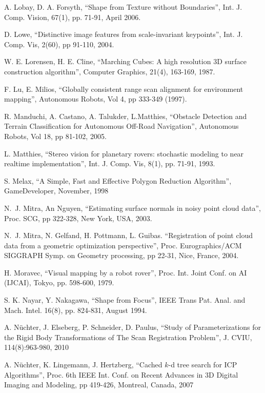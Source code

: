\documentclass[twocolumn,oneside]{book}
\begin{document}
\begin{thebibliography}{99}
A. Lobay, D. A. Forsyth, 
``Shape from Texture without Boundaries'',
Int. J. Comp. Vision, 67(1), pp. 71-91, April 2006.

D. Lowe, 
``Distinctive image features from scale-invariant keypoints'',
Int. J. Comp. Vis, 2(60), pp 91-110, 2004.

W. E. Lorensen, H. E. Cline,
``Marching Cubes: A high resolution 3D surface construction algorithm'',
Computer Graphics, 21(4), 163-169, 1987.

F. Lu, E. Milios,
``Globally consistent range scan alignment for environment mapping'',
Autonomous Robots, Vol 4, pp 333-349 (1997).

R. Manduchi, A. Castano, A. Talukder, L.Matthies,
``Obstacle Detection and Terrain Classification for Autonomous Off-Road Navigation'',
Autonomous Robots, Vol 18, pp 81-102, 2005.

L. Matthies,
``Stereo vision for planetary rovers: stochastic
modeling to near realtime implementation'',
Int. J. Comp. Vis,  8(1), pp. 71-91, 1993.

S. Melax,
``A Simple, Fast and Effective Polygon Reduction Algorithm'',
GameDeveloper, November, 1998

N.~J. Mitra, An Nguyen,
``Estimating surface normals in noisy point cloud data'',
Proc. SCG, pp 322-328, New York, USA, 2003.
  
N.~J. Mitra, N. Gelfand, H. Pottmann, L. Guibas. 
``Registration of point cloud data from a geometric optimization perspective'',
Proc. Eurographics/ACM SIGGRAPH Symp. on Geometry processing, pp 22-31,
Nice, France, 2004.

H. Moravec, 
``Visual mapping by a robot rover'',
Proc. Int. Joint Conf. on AI (IJCAI), Tokyo, pp. 598-600, 1979.

S. K. Nayar, Y. Nakagawa, 
``Shape from Focus'',
IEEE Trans Pat. Anal. and Mach. Intel. 16(8), pp. 824-831, August 1994.

A. N{\"u}chter, J. Elseberg, P. Schneider, D. Paulus,
``Study of Parameterizations for the Rigid Body Transformations of The Scan Registration Problem'',
J. CVIU, 114(8):963-980, 2010

A. N{\"u}chter, K. Lingemann, J. Hertzberg,
``Cached $k$-d tree search for ICP Algorithms'',
Proc. 6th IEEE Int. Conf. on Recent Advances in 3D Digital Imaging and Modeling,
pp 419-426, Montreal, Canada, 2007


\end{thebibliography}
\end{document}
